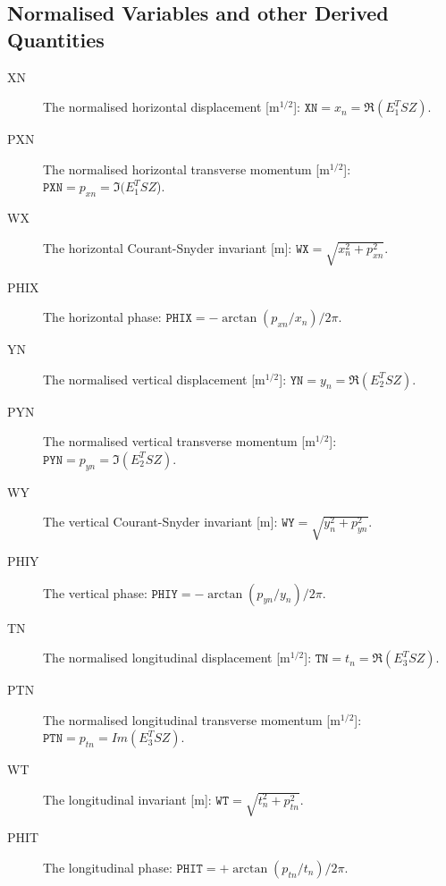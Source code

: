 \subsection{Normalised Variables and other Derived Quantities}
\label{sec:normal}
\begin{description}
\item[XN]
  The normalised horizontal displacement [$\mathrm{m}^{1/2}$]:
  $\mathtt{XN} = x_n = \Re(E_1^T S Z)$.

\item[PXN]
  The normalised horizontal transverse momentum [$\mathrm{m}^{1/2}$]:
  $\mathtt{PXN} = p_{xn} = \Im(E_1^T S Z$).

\item[WX]
  The horizontal Courant-Snyder invariant [m]:
  $\mathtt{WX} = \sqrt{x_n^2 + p_{xn}^2}$.

\item[PHIX]
  The horizontal phase:
  $\mathtt{PHIX} = - \arctan(p_{xn} / x_n) / 2 \pi$.

\item[YN]
  The normalised vertical displacement [$\mathrm{m}^{1/2}$]:
  $\mathtt{YN} = y_n = \Re(E_2^T S Z)$.

\item[PYN]
  The normalised vertical transverse momentum [$\mathrm{m}^{1/2}$]:
  $\mathtt{PYN} = p_{yn} = \Im(E_2^T S Z)$.

\item[WY]
  The vertical Courant-Snyder invariant [m]:
  $\mathtt{WY} = \sqrt{y_n^2 + p_{yn}^2}$.

\item[PHIY]
  The vertical phase:
  $\mathtt{PHIY} = - \arctan(p_{yn} / y_n) / 2 \pi$.

\item[TN]
  The normalised longitudinal displacement [$\mathrm{m}^{1/2}$]:
  $\mathtt{TN} = t_n = \Re(E_3^T S Z)$.

\item[PTN]
  The normalised longitudinal transverse momentum [$\mathrm{m}^{1/2}$]:
  $\mathtt{PTN} = p_{tn} = Im(E_3^T S Z)$.

\item[WT]
  The longitudinal invariant [m]:
  $\mathtt{WT} = \sqrt{t_n^2 + p_{tn}^2}$.

\item[PHIT]
  The longitudinal phase:
  $\mathtt{PHIT} = + \arctan(p_{tn} / t_n) / 2 \pi$.

\end{description}
